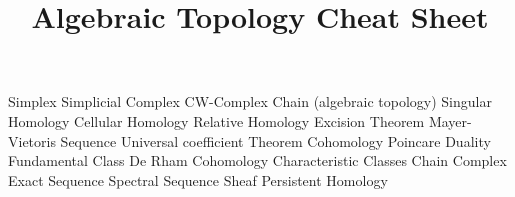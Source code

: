 \documentclass[14pt]{extarticle}
\title{Algebraic Topology Cheat Sheet}
\begin{document}
	\maketitle

	\begin{outline}		

		\1	Simplex
		\1	Simplicial Complex
		\1	CW-Complex	
		\1	Chain (algebraic topology)
		\1	Singular Homology
		\1	Cellular Homology
		\1	Relative Homology
			\2	Excision Theorem
		\1	Mayer-Vietoris Sequence
		\1	Universal coefficient Theorem
		\1	Cohomology
		\1	Poincare Duality
		\1	Fundamental Class
		\1	De Rham Cohomology
		\1	Characteristic Classes
		\1	Chain Complex
		\1	Exact Sequence
		\1	Spectral Sequence
		\1	Sheaf
		\1	Persistent Homology
	\end{outline}
\end{document}

